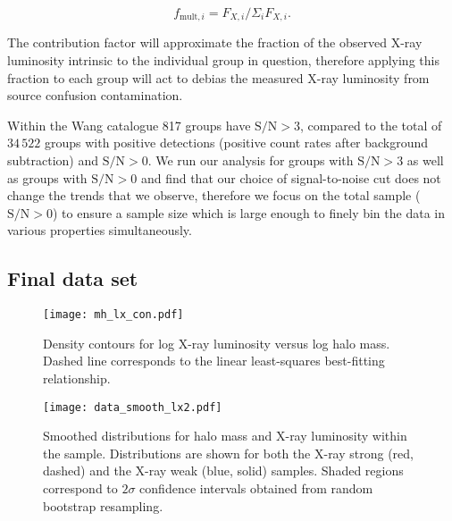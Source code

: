 \begin{equation}
  f_{\mathrm{mult},i} = F_{X,i} / \Sigma_i F_{X,i}.
\end{equation}

\noindent
The contribution factor will approximate the fraction of the observed
X-ray luminosity intrinsic to the individual group in question,
therefore applying this fraction to each group will act to debias the
measured X-ray luminosity from source confusion contamination.
\par
Within the Wang catalogue 817 groups have $\mathrm{S/N} > 3$, compared
to the total of $34\,522$ groups with positive detections (positive
count rates after background subtraction) and $\mathrm{S/N} > 0$.  We
run our analysis for groups with $\mathrm{S/N} > 3$ as well as groups
with $\mathrm{S/N} > 0$ and find that our choice of signal-to-noise
cut does not change the trends that we observe, therefore we focus on
the total sample ($\mathrm{S/N} > 0$) to ensure a sample size which is
large enough to finely bin the data in various properties
simultaneously.

\subsection{Final data set}

\begin{figure}[!ht]
  \centering
  \texttt{[image: mh\_lx\_con.pdf]}
  \caption{Density contours for log X-ray luminosity versus log halo
    mass.  Dashed line corresponds to the linear least-squares
    best-fitting relationship.}
  \label{fig:mh_lx_con}
\end{figure}

\begin{figure}[!ht]
  \centering
  \texttt{[image: data\_smooth\_lx2.pdf]}
  \caption{Smoothed distributions for halo mass and X-ray luminosity
    within the sample.  Distributions are shown for both the X-ray
    strong (red, dashed) and the X-ray weak (blue, solid) samples.
    Shaded regions correspond to $2\sigma$ confidence intervals
    obtained from random bootstrap resampling.}
  \label{fig:data_smooth_lx2}
\end{figure} 


